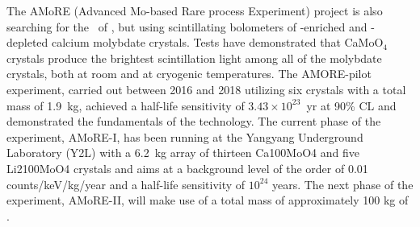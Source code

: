 The AMoRE \cite{Kim:2022uce} (Advanced Mo-based Rare process Experiment) project is also searching for the \bbonu\ of , but using scintillating bolometers of -enriched and -depleted calcium molybdate crystals. Tests have demonstrated that CaMoO$_4$ crystals produce the brightest scintillation light among all of the molybdate crystals, both at room and at cryogenic temperatures. The AMORE-pilot experiment, carried out between 2016 and 2018 utilizing six crystals with a total mass of 1.9~kg, achieved a half-life sensitivity of $3.43\times10^{23}$~yr at 90\% CL and demonstrated the fundamentals of the technology. The current phase of the experiment, AMoRE-I, has been running at the Yangyang Underground Laboratory (Y2L) with a 6.2~kg array of thirteen Ca100MoO4 and five Li2100MoO4 crystals and aims at a background level of the order of 0.01 counts/keV/kg/year and a half-life sensitivity of $10^{24}$ years. The next phase of the experiment, AMoRE-II, will make use of a total mass of approximately 100 kg of .
